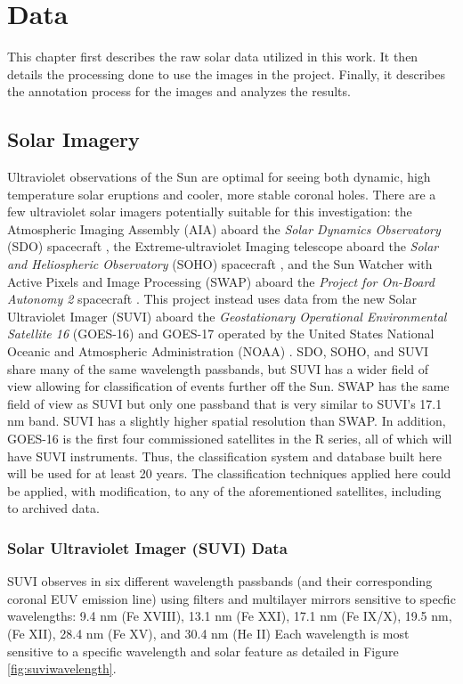 \documentclass[twoside]{report}
\begin{document}
\chapter{Data} \label{ch:data}

This chapter first describes the raw solar data utilized in this work. It then details the processing done to use the images in the project. Finally, it describes the annotation process for the images and analyzes the results. 

\section{Solar Imagery}
Ultraviolet observations of the Sun are optimal for seeing both dynamic, high temperature solar eruptions and cooler, more stable coronal holes. There are a few ultraviolet solar imagers potentially suitable for this investigation: the Atmospheric Imaging Assembly (AIA) aboard the \textit{Solar Dynamics Observatory} (SDO) spacecraft \cite{lemen:2012}, the Extreme-ultraviolet Imaging telescope aboard the \textit{Solar and Heliospheric Observatory} (SOHO) spacecraft \cite{eit}, and the Sun Watcher with Active Pixels and Image Processing (SWAP) aboard the \textit{Project for On-Board Autonomy 2} spacecraft \cite{halain:2013, seaton:2013}. This project instead uses data from the new Solar Ultraviolet Imager (SUVI) aboard the \textit{ Geostationary Operational Environmental Satellite 16} (GOES-16) and GOES-17 operated by the United States National Oceanic and Atmospheric Administration (NOAA) \cite{suvibg, suvibg2}. SDO, SOHO, and SUVI share many of the same wavelength passbands, but SUVI has a wider field of view allowing for classification of events further off the Sun. SWAP has the same field of view as SUVI but only one passband that is very similar to SUVI's 17.1 nm band. SUVI has a slightly higher spatial resolution than SWAP. In addition, GOES-16 is the first four commissioned satellites in the R series, all of which will have SUVI instruments. Thus, the classification system and database built here will be used for at least 20 years. The classification techniques applied here could be applied, with modification, to any of the aforementioned satellites, including to archived data. 

\subsection{Solar Ultraviolet Imager (SUVI) Data}
SUVI observes in six different wavelength passbands (and their corresponding coronal EUV emission line) using filters and multilayer mirrors sensitive to specfic wavelengths: 9.4 nm (Fe \textsc{XVIII}), 13.1 nm (Fe \textsc{XXI}), 17.1 nm (Fe \textsc{IX/X}), 19.5 nm, (Fe \textsc{XII}), 28.4 nm (Fe \textsc{XV}), and 30.4 nm (He \textsc{II}) Each wavelength is most sensitive to a specific wavelength and solar feature as detailed in Figure \ref{fig:suviwavelength}. 
\end{document}
